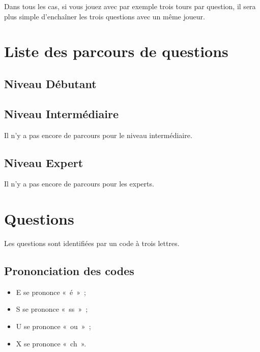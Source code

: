\documentclass[11pt]{article}
\begin{document}
Dans tous les cas, si vous jouez avec par exemple trois tours par question, il
sera plus simple d’enchaîner les trois questions avec un même joueur.

\section{Liste des parcours de questions} \label{parcours}

\subsection{Niveau Débutant}


\subsection{Niveau Intermédiaire}

Il n’y a pas encore de parcours pour le niveau intermédiaire.

\subsection{Niveau Expert}

Il n’y a pas encore de parcours pour les experts.

\section{Questions}

Les questions sont identifiées par un code à trois lettres.

\subsection{Prononciation des codes}

\begin{itemize}
    \item E se prononce « é » ;
    \item S se prononce « ss » ;
    \item U se prononce « ou » ;
    \item X se prononce « ch ».
\end{itemize}
\end{document}
